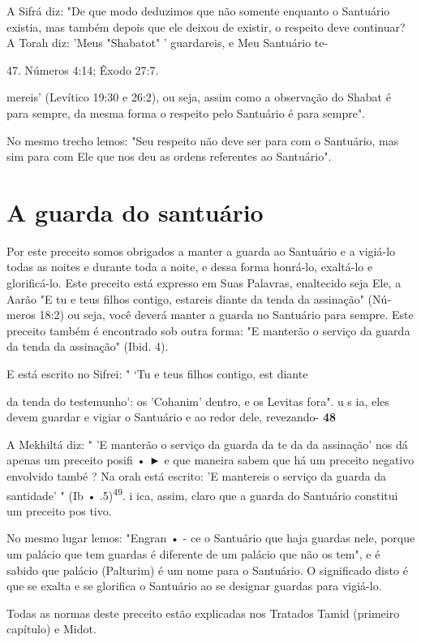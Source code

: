 \begin{itemize}
\begin{enumrate}
\begin{itemize}
\begin{itemize}
A Sifrá diz: "De que modo deduzimos que não somente enquanto o Santuário
existia, mas também depois que ele deixou de existir, o respeito deve
continuar? A Torah diz: 'Meus "Shabatot" ' guardareis, e Meu Santuário
te-

47. Números 4:14; Êxodo 27:7.

mereis' (Levítico 19:30 e 26:2), ou seja, assim como a observação do
Shabat é para sempre, da mesma forma o respeito pelo Santuário é para
sempre".

No mesmo trecho lemos: "Seu respeito não deve ser para com o San­tuário,
mas sim para com Ele que nos deu as ordens referentes ao Santuário".

\section{A guarda do santuário}

Por este preceito somos obrigados a manter a guarda ao Santuário e a
vigiá-lo todas as noites e durante toda a noite, e dessa forma honrá-lo,
exaltá-lo e glorificá-lo. Este preceito está expresso em Suas Palavras,
enaltecido seja Ele, a Aarão "E tu e teus filhos contigo, estareis
diante da tenda da assinação" (Nú­meros 18:2) ou seja, você deverá
manter a guarda no Santuário para sempre. Este preceito também é
encontrado sob outra forma: "E manterão o serviço da guarda da tenda da
assinação" (Ibid. 4).

E está escrito no Sifrei: " `Tu e teus filhos contigo, est diante

da tenda do testemunho': os 'Cohanim' dentro, e os Levitas fora". u s
ia, eles devem guardar e vigiar o Santuário e ao redor dele, revezando-
\textbf{48}

A Mekhiltá diz: " 'E manterão o serviço da guarda da te da da
assi­nação' nos dá apenas um preceito posifi • ► e que maneira sabem que
há um preceito negativo envolvido també ? Na orah está escrito: 'E
mantereis o serviço da guarda da santidade' " (Ib •
.5)\textsuperscript{49}. i ica, assim, claro que a guarda do Santuário
constitui um preceito pos tivo.

No mesmo lugar lemos: "Engran • - ce o Santuário que haja guardas nele,
porque um palácio que tem guardas é diferente de um palácio que não os
tem", e é sabido que palácio (Palturim) é um nome para o Santuário. O
signi­ficado disto é que se exalta e se glorifica o Santuário ao se
designar guardas pa­ra vigiá-lo.

Todas as normas deste preceito estão explicadas nos Tratados Ta­mid
(primeiro capítulo) e Midot.


\end{itemize}
\end{itemize}
\end{enumrate}
\end{itemize}
